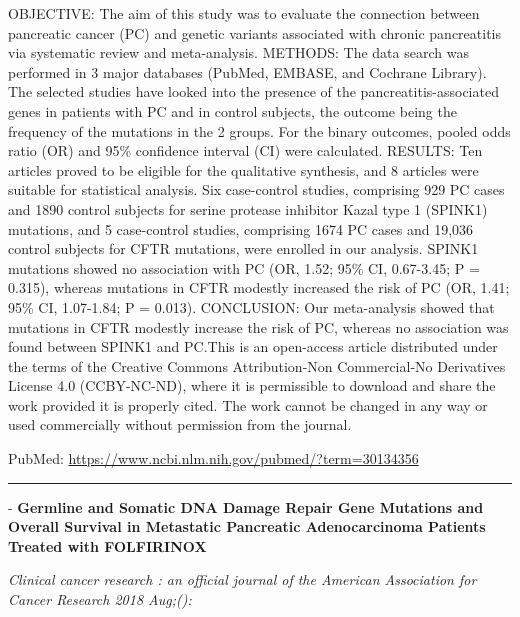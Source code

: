 \documentclass[]{article}
\begin{document}
OBJECTIVE: The aim of this study was to evaluate the connection between
pancreatic cancer (PC) and genetic variants associated with chronic
pancreatitis via systematic review and meta-analysis. METHODS: The data
search was performed in 3 major databases (PubMed, EMBASE, and Cochrane
Library). The selected studies have looked into the presence of the
pancreatitis-associated genes in patients with PC and in control
subjects, the outcome being the frequency of the mutations in the 2
groups. For the binary outcomes, pooled odds ratio (OR) and 95\%
confidence interval (CI) were calculated. RESULTS: Ten articles proved
to be eligible for the qualitative synthesis, and 8 articles were
suitable for statistical analysis. Six case-control studies, comprising
929 PC cases and 1890 control subjects for serine protease inhibitor
Kazal type 1 (SPINK1) mutations, and 5 case-control studies, comprising
1674 PC cases and 19,036 control subjects for CFTR mutations, were
enrolled in our analysis. SPINK1 mutations showed no association with PC
(OR, 1.52; 95\% CI, 0.67-3.45; P = 0.315), whereas mutations in CFTR
modestly increased the risk of PC (OR, 1.41; 95\% CI, 1.07-1.84; P =
0.013). CONCLUSION: Our meta-analysis showed that mutations in CFTR
modestly increase the risk of PC, whereas no association was found
between SPINK1 and PC.This is an open-access article distributed under
the terms of the Creative Commons Attribution-Non Commercial-No
Derivatives License 4.0 (CCBY-NC-ND), where it is permissible to
download and share the work provided it is properly cited. The work
cannot be changed in any way or used commercially without permission
from the journal.

PubMed: \url{https://www.ncbi.nlm.nih.gov/pubmed/?term=30134356}

{}

{}

\begin{center}\rule{0.5\linewidth}{\linethickness}\end{center}

 - \textbf{Germline and Somatic DNA Damage Repair Gene Mutations and
Overall Survival in Metastatic Pancreatic Adenocarcinoma Patients
Treated with FOLFIRINOX}

\emph{Clinical cancer research : an official journal of the American
Association for Cancer Research 2018 Aug;():}
\end{document}
